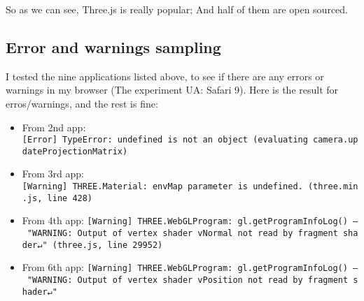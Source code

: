 So as we can see, Three.js is really popular; And half of them are open
sourced.

\subsection{Error and warnings
sampling}\label{error-and-warnings-sampling}

I tested the nine applications listed above, to see if there are any
errors or warnings in my browser (The experiment UA: Safari 9). Here is
the result for erros/warnings, and the rest is fine:

\begin{itemize}
\tightlist
\item
  From 2nd app:
  \texttt{{[}Error{]}\ TypeError:\ undefined\ is\ not\ an\ object\ (evaluating\ \textquotesingle{}camera.updateProjectionMatrix\textquotesingle{})}
\item
  From 3rd app:
  \texttt{{[}Warning{]}\ THREE.Material:\ \textquotesingle{}envMap\textquotesingle{}\ parameter\ is\ undefined.\ (three.min.js,\ line\ 428)}
\item
  From 4th app:
  \texttt{{[}Warning{]}\ THREE.WebGLProgram:\ gl.getProgramInfoLog()\ –\ "WARNING:\ Output\ of\ vertex\ shader\ \textquotesingle{}vNormal\textquotesingle{}\ not\ read\ by\ fragment\ shader↵"\ (three.js,\ line\ 29952)}
\item
  From 6th app:
  \texttt{{[}Warning{]}\ THREE.WebGLProgram:\ gl.getProgramInfoLog()\ –\ "WARNING:\ Output\ of\ vertex\ shader\ \textquotesingle{}vPosition\textquotesingle{}\ not\ read\ by\ fragment\ shader↵"}
\end{itemize}
